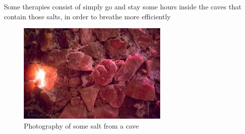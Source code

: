 \documentclass[draft, final]{report}
\begin{document}
Some therapies consist of simply go and stay some hours inside the caves that contain those salts, in order to breathe more efficiently
\begin{figure}[!ht]
  \centering
  \includegraphics[scale=1]{LateX/Images/salt.jpg}
  \caption{Photography of some salt from a cave\cite{cavesalt}}
\end{figure}
\newpage
\end{document}
